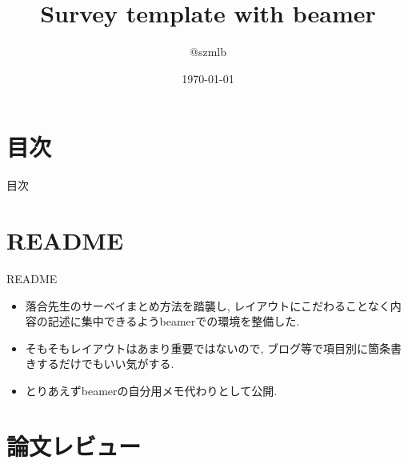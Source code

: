 \documentclass[8pt, dvipdfmx]{beamer}
\title{Survey template with beamer}
\author{@szmlb}
\date{\today}
\begin{document}
\maketitle

\section{目次}
\begin{frame}{目次}
 \tableofcontents
\end{frame}

\section{README}
\begin{frame}{README}
  \begin{itemize}
   \item 落合先生のサーベイまとめ方法を踏襲し, レイアウトにこだわることなく内容の記述に集中できるようbeamerでの環境を整備した.
   \item そもそもレイアウトはあまり重要ではないので,  ブログ等で項目別に箇条書きするだけでもいい気がする.
   \item とりあえずbeamerの自分用メモ代わりとして公開.
  \end{itemize}
\end{frame}

\section{論文レビュー}
\end{document}

